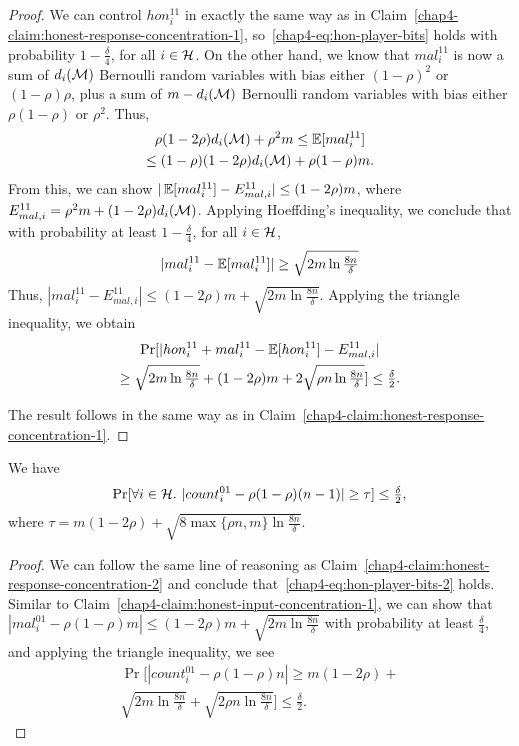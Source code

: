 \begin{proof}
We can control $hon_i^{11}$ in exactly the same way as in Claim~\ref{chap4-claim:honest-response-concentration-1}, so~\eqref{chap4-eq:hon-player-bits} holds with probability $1-\frac{\delta}{4}$, for all $i \in \mathcal{H}$.
On the other hand, we know that $mal_i^{11}$ is now a sum of $d_i(\mathcal{M})$ Bernoulli random variables with bias either $(1-\rho)^2$ or $(1-\rho)\rho$, plus a sum of $m - d_i(\mathcal{M})$ Bernoulli random variables with bias either $\rho(1-\rho)$ or $\rho^2$. Thus, 
\begin{multline*}
	\rho(1-2\rho)d_i(\mathcal{M}) + \rho^2 m \leq \operatorname{\mathbb{E}}[mal_i^{11}] \\
	\leq (1-\rho)(1-2\rho)d_i(\mathcal{M}) + \rho(1-\rho) m.
\end{multline*}
From this, we can show $|\operatorname{\mathbb{E}}[mal_i^{11}] - E_{mal,i}^{11}| \leq (1-2\rho)m$, where $E_{mal,i}^{11} = \rho^2 m + (1-2\rho) d_i(\mathcal{M})$.
 Applying Hoeffding's inequality, we conclude that with probability at least $1 - \frac{\delta}{4}$, for all $i \in \mathcal{H}$,
\[
    |mal_i^{11} - \operatorname{\mathbb{E}}[mal_i^{11}]| \geq \sqrt{2m \ln \tfrac{8n}{\delta}}
\]
Thus, $|mal_i^{11} - E_{mal,i}^{11}| \leq (1-2\rho)m + \sqrt{2m \ln \tfrac{8n}{\delta}}$. Applying the triangle inequality, we obtain
\begin{multline*}
\Pr[|hon_i^{11} + mal_i^{11} - \operatorname{\mathbb{E}}[hon_i^{11}] - E_{mal,i}^{11}| \\ \geq \sqrt{2m \ln \tfrac{8n}{\delta}} + (1-2\rho)m + 2\sqrt{ \rho n \ln \tfrac{8n}{\delta}}] \leq \tfrac{\delta}{2}.
\end{multline*}

The result follows in the same way as in Claim~\ref{chap4-claim:honest-response-concentration-1}.
\end{proof}

\begin{claim}\label{chap4-claim:honest-input-concentration-2}
We have
\[
    \Pr[\forall i \in \mathcal{H}.~|count_i^{01} - \rho(1-\rho)(n-1)| \geq \tau] \leq \tfrac{\delta}{2},
\]
where $\tau = m(1-2\rho) + \sqrt{8 \max\{\rho n, m\} \ln \frac{8n}{\delta}}$.
\end{claim}

\begin{proof}
We can follow the same line of reasoning as Claim~\ref{chap4-claim:honest-response-concentration-2} and conclude that~\eqref{chap4-eq:hon-player-bits-2} holds.
Similar to Claim~\ref{chap4-claim:honest-input-concentration-1}, we can show that $|mal_i^{01} - \rho(1-\rho) m| \leq (1-2\rho)m + \sqrt{2m \ln \frac{8n}{\delta}}$ with probability at least $\frac{\delta}{4}$, and applying the triangle inequality, we see
\begin{multline*}
    \Pr[|count_i^{01} - \rho(1-\rho)n| \geq m(1-2\rho) + \\ \sqrt{2m \ln \tfrac{8n}{\delta}}  + \sqrt{2\rho n \ln \tfrac{8n}{\delta}}] \leq \tfrac{\delta}{2}.
\end{multline*}
\end{proof}

